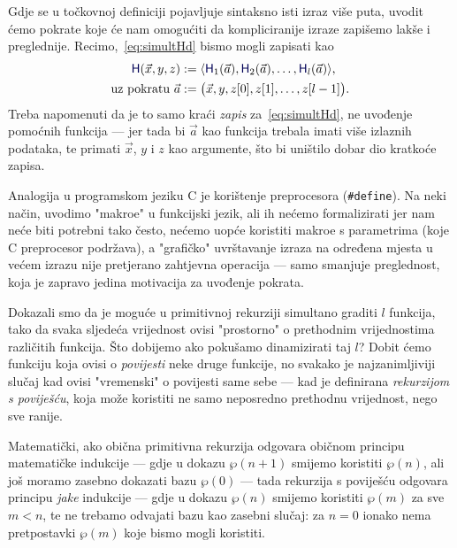 \begin{napomena}
Gdje se u točkovnoj definiciji pojavljuje sintaksno isti izraz više puta, uvodit ćemo pokrate koje će nam omogućiti da kompliciranije izraze zapišemo lakše i preglednije. Recimo,~\eqref{eq:simultHd} bismo mogli zapisati kao
\begin{align}
    \f H(\vec x,y,z)&:=\langle \f H_1(\vec a),\f H_2(\vec a),\dotsc,\f H_l(\vec a)\rangle\text,\\
    \text{uz pokratu } \vec a&:=\bigl(\vec x,y,z[0],z[1],\dotsc,z[l-1]\bigr)\text.
\end{align}
Treba napomenuti da je to samo kraći \emph{zapis} za~\eqref{eq:simultHd}, ne uvođenje pomoćnih funkcija --- jer tada bi $\vec a$ kao funkcija trebala imati više izlaznih podataka, te primati $\vec x$, $y$ i $z$ kao argumente, što bi uništilo dobar dio kratkoće zapisa.

Analogija u programskom jeziku C je korištenje preprocesora (\verb+#define+). Na neki način, uvodimo "makroe" u funkcijski jezik, ali ih nećemo formalizirati jer nam neće biti potrebni tako često, nećemo uopće koristiti makroe s parametrima (koje C preprocesor podržava), a "grafičko" uvrštavanje izraza na određena mjesta u većem izrazu nije pretjerano zahtjevna operacija --- samo smanjuje preglednost, koja je zapravo jedina motivacija za uvođenje pokrata.
\end{napomena}

Dokazali smo da je moguće u primitivnoj rekurziji simultano graditi $l$ funkcija, tako da svaka sljedeća vrijednost ovisi "prostorno" o prethodnim vrijednostima različitih funkcija. Što dobijemo ako pokušamo dinamizirati taj $l$? Dobit ćemo funkciju koja ovisi o \emph{povijesti} neke druge funkcije, no svakako je najzanimljiviji slučaj kad ovisi "vremenski" o povijesti same sebe --- kad je definirana \emph{rekurzijom s poviješću}, koja može koristiti ne samo neposredno prethodnu vrijednost, nego sve ranije.

Matematički, ako obična primitivna rekurzija odgovara običnom principu matematičke indukcije --- gdje u dokazu $\wp(n+1)$ smijemo koristiti $\wp(n)$, ali još moramo zasebno dokazati bazu $\wp(0)$ --- tada rekurzija s poviješću odgovara principu \emph{jake} indukcije --- gdje u dokazu $\wp(n)$ smijemo koristiti $\wp(m)$ za sve $m<n$, te ne trebamo odvajati bazu kao zasebni slučaj: za $n=0$ ionako nema pretpostavki $\wp(m)$ koje bismo mogli koristiti.


